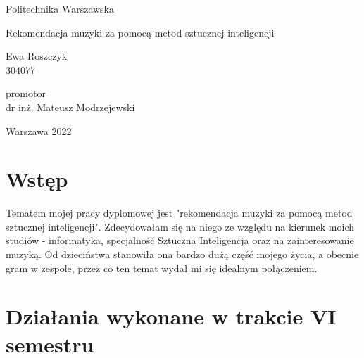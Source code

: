 \documentclass[a4paper,titleauthor]{mwart}
\begin{document}

\def\infinity{\rotatebox{90}{8}}
\begin{titlepage}
    \begin{center}
        \vspace*{1cm}
        \huge Politechnika Warszawska\\
        
        \vspace*{1.5cm}
        
        \vspace{5.5cm}
        \Huge Rekomendacja muzyki za pomocą metod sztucznej inteligencji\\
            
        \vspace{5.5cm}
            
        \huge Ewa Roszczyk\\
        304077
        
        \vspace{1cm}
        \huge promotor\\
        dr inż. Mateusz Modrzejewski
        \vfill
            
        Warszawa 2022\\
            
    \end{center}
\end{titlepage}

\date{\today}

\newpage

\tableofcontents

\newpage

\section{Wstęp}

Tematem mojej pracy dyplomowej jest "rekomendacja muzyki za pomocą metod sztucznej inteligencji". Zdecydowałam się na niego ze względu na kierunek moich studiów - informatyka, specjalność Sztuczna Inteligencja oraz na zainteresowanie muzyką. Od dzieciństwa stanowiła ona bardzo dużą część mojego życia, a obecnie gram w zespole, przez co ten temat wydał mi się idealnym połączeniem. 

\section{Działania wykonane w trakcie VI semestru}
\end{document}
